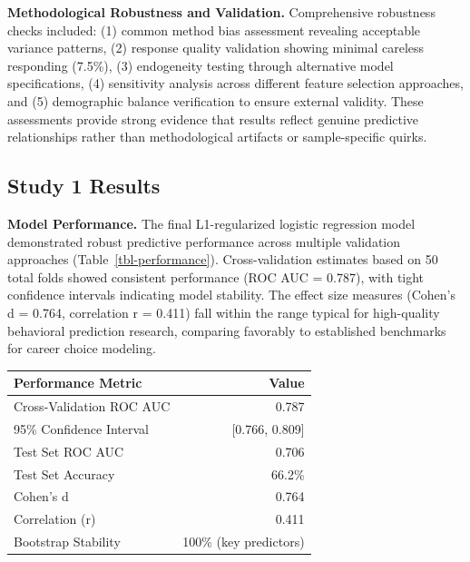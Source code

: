 \documentclass[
  man,
  longtable,
  nolmodern,
  notxfonts,
  notimes,
  colorlinks=true,linkcolor=blue,citecolor=blue,urlcolor=blue]{apa7}
\begin{document}
\textbf{Methodological Robustness and Validation.} Comprehensive
robustness checks included: (1) common method bias assessment revealing
acceptable variance patterns, (2) response quality validation showing
minimal careless responding (7.5\%), (3) endogeneity testing through
alternative model specifications, (4) sensitivity analysis across
different feature selection approaches, and (5) demographic balance
verification to ensure external validity. These assessments provide
strong evidence that results reflect genuine predictive relationships
rather than methodological artifacts or sample-specific quirks.

\subsection{Study 1 Results}\label{study-1-results}

\textbf{Model Performance.} The final L1-regularized logistic regression
model demonstrated robust predictive performance across multiple
validation approaches (Table~\ref{tbl-performance}). Cross-validation
estimates based on 50 total folds showed consistent performance (ROC AUC
= 0.787), with tight confidence intervals indicating model stability.
The effect size measures (Cohen's d = 0.764, correlation r = 0.411) fall
within the range typical for high-quality behavioral prediction
research, comparing favorably to established benchmarks for career
choice modeling.

\begin{table}

{\caption{{Model Performance Summary for L1-Regularized Logistic
Regression}{\label{tbl-performance}}}
\vspace{-20pt}}

\begin{longtable}[]{@{}lr@{}}
\toprule\noalign{}
Performance Metric & Value \\
\midrule\noalign{}
\endhead
\bottomrule\noalign{}
\endlastfoot
Cross-Validation ROC AUC & 0.787 \\
95\% Confidence Interval & {[}0.766, 0.809{]} \\
Test Set ROC AUC & 0.706 \\
Test Set Accuracy & 66.2\% \\
Cohen's d & 0.764 \\
Correlation (r) & 0.411 \\
Bootstrap Stability & 100\% (key predictors) \\
\end{longtable}

\end{table}
\end{document}

